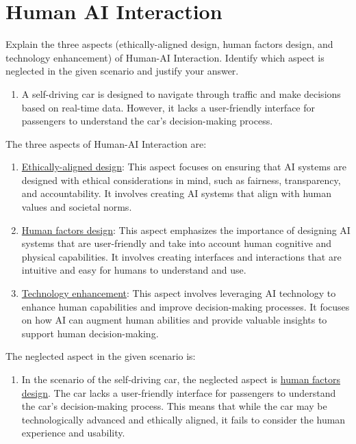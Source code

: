 \section{Human AI Interaction}

\begin{ejercicio}
    Explain the three aspects (ethically-aligned design, human factors design, and technology enhancement) of Human-AI Interaction. Identify which aspect is neglected in the given scenario and justify your answer.
    \begin{enumerate}
        \item A self-driving car is designed to navigate through traffic and make decisions based on real-time data. However, it lacks a user-friendly interface for passengers to understand the car's decision-making process.
    \end{enumerate}

    The three aspects of Human-AI Interaction are:
    \begin{enumerate}
        \item \ul{Ethically-aligned design}: This aspect focuses on ensuring that AI systems are designed with ethical considerations in mind, such as fairness, transparency, and accountability. It involves creating AI systems that align with human values and societal norms.
        \item \ul{Human factors design}: This aspect emphasizes the importance of designing AI systems that are user-friendly and take into account human cognitive and physical capabilities. It involves creating interfaces and interactions that are intuitive and easy for humans to understand and use.
        \item \ul{Technology enhancement}: This aspect involves leveraging AI technology to enhance human capabilities and improve decision-making processes. It focuses on how AI can augment human abilities and provide valuable insights to support human decision-making.
    \end{enumerate}

    The neglected aspect in the given scenario is:
    \begin{enumerate}
        \item In the scenario of the self-driving car, the neglected aspect is \ul{human factors design}. The car lacks a user-friendly interface for passengers to understand the car's decision-making process. This means that while the car may be technologically advanced and ethically aligned, it fails to consider the human experience and usability.
    \end{enumerate}
\end{ejercicio}

